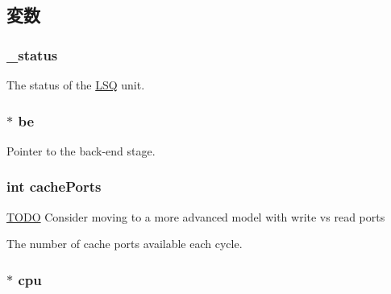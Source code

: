\subsection{変数}
\hypertarget{classOzoneLSQ_a6cdf6e6db875a442f3ab6db542bd2bb5}{
\subsubsection[{\_\-status}]{ {\bf \_\-status}}}
\label{classOzoneLSQ_a6cdf6e6db875a442f3ab6db542bd2bb5}
The status of the \hyperlink{classLSQ}{LSQ} unit. \hypertarget{classOzoneLSQ_a84f815aa1fa864ba2e6d75f5ad2b52d1}{
\subsubsection[{be}]{$\ast$ {\bf be}}}
\label{classOzoneLSQ_a84f815aa1fa864ba2e6d75f5ad2b52d1}
Pointer to the back-\/end stage. \hypertarget{classOzoneLSQ_ab2e23636971c40e7ed945026b2a184e1}{
\subsubsection[{cachePorts}]{\setlength{\rightskip}{0pt plus 5cm}int {\bf cachePorts}}}
\label{classOzoneLSQ_ab2e23636971c40e7ed945026b2a184e1}
\begin{Desc}
\item[\hyperlink{todo__todo000045}{TODO}]Consider moving to a more advanced model with write vs read ports \end{Desc}
The number of cache ports available each cycle. \hypertarget{classOzoneLSQ_a766385c2941cd46525f4d9dff90200a2}{
\subsubsection[{cpu}]{$\ast$ {\bf cpu}}}
